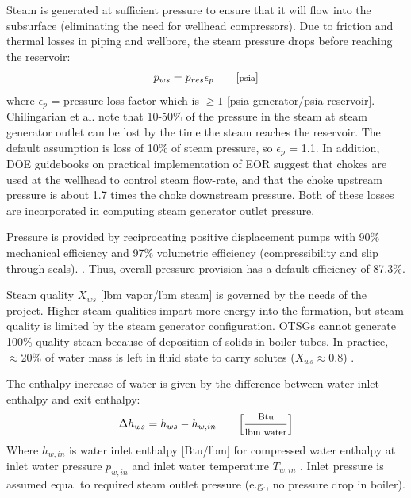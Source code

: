 \documentclass[11pt]{report}
\newcommand{\marg}[1]{{\footnotesize\textit{\textcolor{stanford}{'#1'}}}}
\newcommand{\marginnote}[1]{\marginpar{\marg{#1}}}
\begin{document}
Steam is generated at sufficient pressure to ensure that it will flow into the subsurface (eliminating the need for wellhead compressors). Due to friction and thermal losses in piping and wellbore, the steam pressure drops before reaching the reservoir: \marginnote{Steam Generation 1.2.8}
\begin{equation}\label{eq:steam_ps}
p_{ws} = p_{res} \epsilon_{p} \quad\quad \footnotesize{\left[\text{psia}\right]} 
\end{equation}
where $\epsilon_p$ = pressure loss factor which is $\geq 1$ [psia generator/psia reservoir]. Chilingarian et al. \cite[p. 228]{Chilingarian1987} note that 10-50\% of the pressure in the steam at steam generator outlet can be lost by the time the steam reaches the reservoir.  The default assumption is loss of 10\% of steam pressure, so $\epsilon_{p}$ = 1.1.  In addition, DOE guidebooks on practical implementation of EOR suggest that chokes are used at the wellhead to control steam flow-rate, and that the choke upstream pressure is about 1.7 times the choke downstream pressure.  Both of these losses are incorporated in computing steam generator outlet pressure.\marginnote{Steam Generation 2.1.7}

Pressure is provided by reciprocating positive displacement pumps with 90\% mechanical efficiency and 97\% volumetric efficiency (compressibility and slip through seals). \cite[Fig. 27]{Tackett2008}. Thus, overall pressure provision has a default efficiency of 87.3\%.

Steam quality $X_{ws}$ [lbm vapor/lbm steam] is governed by the needs of the project. Higher steam qualities impart more energy into the formation, but steam quality is limited by the steam generator configuration. OTSGs cannot generate 100\% quality steam because of deposition of solids in boiler tubes. In practice, $\approx$20\% of water mass is left in fluid state to carry solutes ($X_{ws} \approx 0.8$) \cite{Ganapathy2003}. 

The enthalpy increase of water is given by the difference between water inlet enthalpy and exit enthalpy:
\marginnote{Steam Generation 2.1.12}
\begin{equation}\label{eq:steam_hw}
\Delta h_{ws} = h_{ws} - h_{w,in} \quad\quad \footnotesize{\left[\frac{\text{Btu}}{\text{lbm water}}\right]} 
\end{equation}
Where $h_{w,in}$ is water inlet enthalpy [Btu/lbm] for \marginnote{Input Data Table 5.4} compressed water enthalpy at inlet water pressure $p_{w,in}$ and inlet water temperature $T_{w,in}$ \cite{Knovel2006}. Inlet pressure is assumed equal to required steam outlet pressure (e.g., no pressure drop in boiler). 
\end{document}

